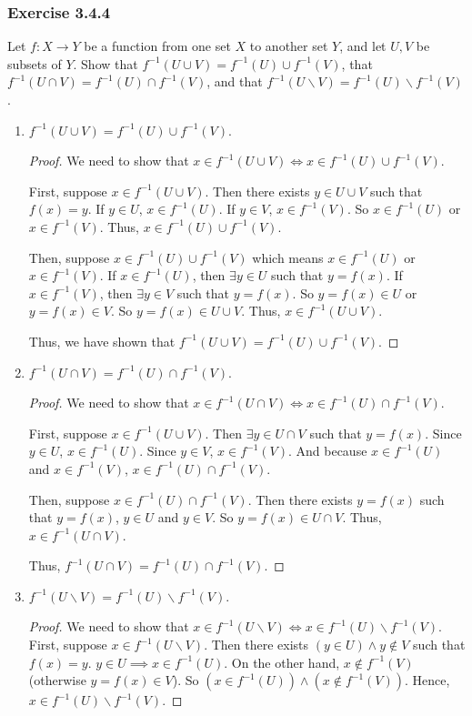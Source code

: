 \documentclass[12pt, letter]{article}
\begin{document}
\subsubsection*{Exercise 3.4.4}
Let $f:X\to Y$ be a function from one set $X$ to another set $Y$, and let $U,V$ be subsets of $Y$. Show that $f^{-1}(U\cup V)=f^{-1}(U)\cup f^{-1}(V)$, that $f^{-1}(U\cap V)=f^{-1}(U)\cap f^{-1}(V)$, and that $f^{-1}(U\backslash V)=f^{-1}(U)\backslash f^{-1}(V)$.
\begin{enumerate}
    \item $f^{-1}(U\cup V)=f^{-1}(U)\cup f^{-1}(V)$.
    \begin{proof}
        We need to show that $x\in f^{-1}(U\cup V)\iff x\in f^{-1}(U)\cup f^{-1}(V)$. 

        First, suppose $x\in f^{-1}(U\cup V)$. Then there exists $y\in U\cup V$ such that $f(x)=y$. If $y\in U$, $x\in f^{-1}(U)$. If $y\in V$, $x\in f^{-1}(V)$. So $x\in f^{-1}(U)$ or $x\in f^{-1}(V)$. Thus, $x\in f^{-1}(U)\cup f^{-1}(V)$.

        Then, suppose $x\in f^{-1}(U)\cup f^{-1}(V)$ which means $x\in f^{-1}(U)$ or $x\in f^{-1}(V)$. If $x\in f^{-1}(U)$, then $\exists y\in U$ such that $y=f(x)$. If $x\in f^{-1}(V)$, then $\exists y\in V$ such that $y=f(x)$. So $y=f(x)\in U$ or $y=f(x)\in V$. So $y=f(x)\in U\cup V$.
        Thus, $x\in f^{-1}(U\cup V)$. 
        
        Thus, we have shown that $f^{-1}(U\cup V)=f^{-1}(U)\cup f^{-1}(V)$.
    \end{proof}
    \item $f^{-1}(U\cap V)=f^{-1}(U)\cap f^{-1}(V)$.
    \begin{proof}
        We need to show that $x\in f^{-1}(U\cap V)\iff x\in f^{-1}(U)\cap f^{-1}(V)$. 

        First, suppose $x\in f^{-1}(U\cup V)$. Then $\exists y\in U\cap V$ such that $y=f(x)$. Since $y\in U$, $x\in f^{-1}(U)$. Since $y\in V$, $x\in f^{-1}(V)$. And because $x\in f^{-1}(U)$ and $x\in f^{-1}(V)$, $x\in f^{-1}(U)\cap f^{-1}(V)$.

        Then, suppose $x\in f^{-1}(U)\cap f^{-1}(V)$. Then there exists $y=f(x)$ such that $y=f(x)$, $y\in U$ and $y\in V$. So $y=f(x)\in U\cap V$. Thus, $x\in f^{-1}(U\cap V)$.

        Thus, $f^{-1}(U\cap V)=f^{-1}(U)\cap f^{-1}(V)$.
    \end{proof}
    \item $f^{-1}(U\backslash V)=f^{-1}(U)\backslash f^{-1}(V)$.
    \begin{proof}
        We need to show that $x\in f^{-1}(U\backslash V)\iff x\in f^{-1}(U)\backslash f^{-1}(V)$. 
        First, suppose $x\in f^{-1}(U\backslash V)$. Then there exists $(y\in U)\land y\notin V$ such that $f(x)=y$. $y\in U\implies x\in f^{-1}(U)$. On the other hand, $x\notin f^{-1}(V)$ (otherwise $y=f(x)\in V$). 
        So $(x\in f^{-1}(U)) \land (x\notin f^{-1}(V))$. Hence, $x\in f^{-1}(U)\backslash f^{-1}(V)$.


\end{proof}
\end{enumerate}
\end{document}
